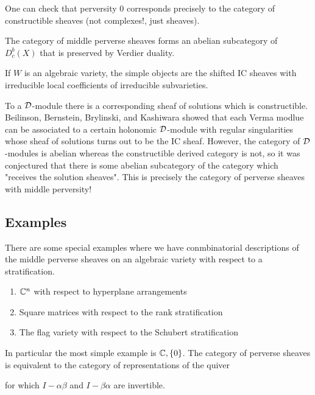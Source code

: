 \documentclass[12pt]{article}
\begin{document}
\begin{remark}
    One can check that perversity $0$ corresponds precisely to the
    category of constructible sheaves (not complexes!, just sheaves).
\end{remark}

\begin{theorem}
    The category of middle perverse sheaves forms an abelian
    subcategory of $D^b_c(X)$ that is preserved by Verdier duality.
\end{theorem}

\begin{theorem}
    If $W$ is an algebraic variety, the simple objects
    are the shifted IC sheaves with irreducible local coefficients of irreducible
    subvarieties.
\end{theorem}

\begin{remark}
    To a ${\mathcal{D}}$-module there is a corresponding sheaf of solutions which is constructible. Beilinson, Bernstein, Brylinski, and Kashiwara showed that each Verma modlue can be associated to a certain holonomic ${\mathcal{D}}$-module with regular singularities whose sheaf of solutions turns out to be the IC sheaf. However, the category of ${\mathcal{D}}$-modules is abelian whereas the constructible derived category is not, so it was conjectured that there is some abelian subcategory of the category which "receives the solution sheaves". This is precisely the category of perverse sheaves with middle perversity!
\end{remark}
\subsection{Examples}
\begin{example}
    There are some special examples where we have conmbinatorial descriptions of the
    middle perverse sheaves on an algebraic variety with respect to a
    stratification. \begin{enumerate}
        \item $\mathbb{C}^n$ with respect to hyperplane arrangements
        \item Square matrices with respect to the rank stratification
        \item The flag variety with respect to the Schubert stratification
    \end{enumerate}
    In particular the most simple example is $\mathbb{C}, \{0\}$. The category of perverse
    sheaves is equivalent to the category of representations of the quiver \begin{center}
    \end{center} for which $I-\alpha\beta$ and $I-\beta\alpha$ are invertible.
\end{example}
\end{document}
